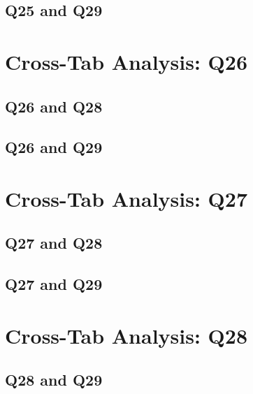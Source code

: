 \documentclass{report}
\begin{document}
\section{Q25 and Q29}\clearpage

\chapter{Cross-Tab Analysis: Q26}

\section{Q26 and Q28}\clearpage
\section{Q26 and Q29}\clearpage

\chapter{Cross-Tab Analysis: Q27}

\section{Q27 and Q28}\clearpage
\section{Q27 and Q29}\clearpage

\chapter{Cross-Tab Analysis: Q28}

\section{Q28 and Q29}\clearpage





\end{document}
